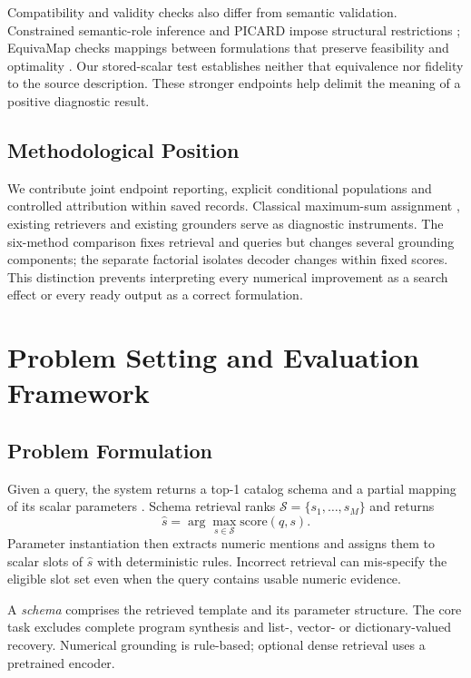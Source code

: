 \documentclass[pdflatex,iicol,sn-basic,Numbered]{sn-jnl}
\begin{document}
Compatibility and validity checks also differ from semantic validation. Constrained semantic-role inference and PICARD impose structural restrictions \cite{punyakanok2004ilp,scholak2021picard}; EquivaMap checks mappings between formulations that preserve feasibility and optimality \cite{zhai2025equivamap}. Our stored-scalar test establishes neither that equivalence nor fidelity to the source description. These stronger endpoints help delimit the meaning of a positive diagnostic result.

\subsection{Methodological Position}
\label{subsec:rw_position}
We contribute joint endpoint reporting, explicit conditional populations and controlled attribution within saved records. Classical maximum-sum assignment \cite{kuhn1955assignment}, existing retrievers and existing grounders serve as diagnostic instruments. The six-method comparison fixes retrieval and queries but changes several grounding components; the separate factorial isolates decoder changes within fixed scores. This distinction prevents interpreting every numerical improvement as a search effect or every ready output as a correct formulation.

\section{Problem Setting and Evaluation Framework}
\label{sec:task}
\subsection{Problem Formulation}
\label{subsec:method_problem}

Given a query, the system returns a top-1 catalog schema and a partial mapping of its scalar parameters \cite{nlp4lp_dataset}. Schema retrieval ranks $\mathcal{S}=\{s_1,\dots,s_M\}$ and returns
\begin{equation}
\hat{s}=\arg\max_{s \in \mathcal{S}} \mathrm{score}(q,s).
\label{eq:top1_schema}
\end{equation}
Parameter instantiation then extracts numeric mentions and assigns them to scalar slots of $\hat{s}$ with deterministic rules. Incorrect retrieval can mis-specify the eligible slot set even when the query contains usable numeric evidence.

A \emph{schema} comprises the retrieved template and its parameter structure. The core task excludes complete program synthesis and list-, vector- or dictionary-valued recovery. Numerical grounding is rule-based; optional dense retrieval uses a pretrained encoder.
\end{document}
